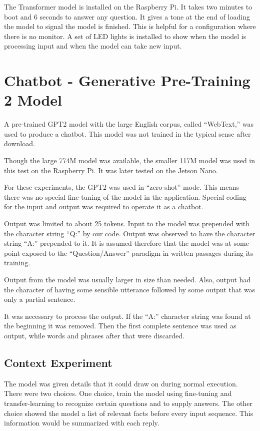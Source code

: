The Transformer model is installed on the Raspberry Pi. It takes two minutes to boot and 6 seconds to answer any question. It gives a tone at the end of loading the model to signal the model is finished. This is helpful for a configuration where there is no monitor. A set of LED lights is installed to show when the model is processing input and when the model can take new input. %


\section{Chatbot - Generative Pre-Training 2 Model}

\label{install-gpt2-chatbot}
A pre-trained GPT2 model with the large English corpus, called ``WebText,'' was used to produce a chatbot. This model was not trained in the typical sense after download. 

Though the large 774M model was available, the smaller 117M model was used in this test on the Raspberry Pi. It was later tested on the Jetson Nano.

For these experiments, the GPT2 was used in ``zero-shot'' mode. This means there was no special fine-tuning of the model in the application. Special coding for the input and output was required to operate it as a chatbot. 

Output was limited to about 25 tokens. Input to the model was prepended with the character string ``Q:'' by our code. Output was observed to have the character string ``A:'' prepended to it. It is assumed therefore that the model was at some point exposed to the ``Question/Answer'' paradigm in written passages during its training. %

Output from the model was usually larger in size than needed. Also, output had the character of having some sensible utterance followed by some output that was only a partial sentence.

It was necessary to process the output. If the ``A:'' character string was found at the beginning it was removed. Then the first complete sentence was used as output, while words and phrases after that were discarded.

\subsection{Context Experiment}
The model was given details that it could draw on during normal execution. 
There were two choices. One choice, train the model using fine-tuning and transfer-learning to recognize certain questions and to supply answers. The other choice showed the model a list of relevant facts before every input sequence. This information would be summarized with each reply.

